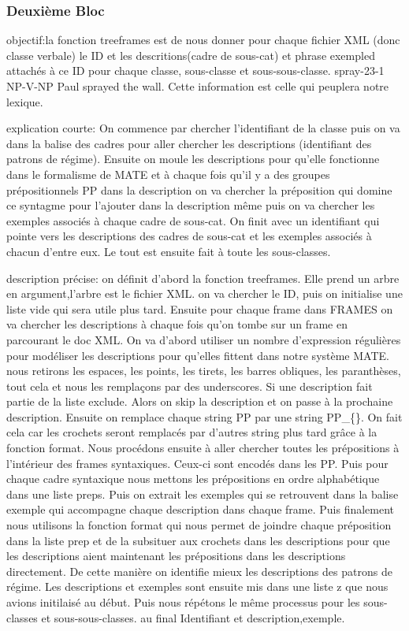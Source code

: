 \subsubsection{Deuxième Bloc}
objectif:la fonction treeframes est de nous donner pour chaque fichier XML (donc classe verbale) le ID et les descritions(cadre de sous-cat) et phrase exempled attachés à ce ID pour chaque classe, sous-classe et sous-sous-classe. spray-23-1 NP-V-NP Paul sprayed the wall. Cette information est celle qui peuplera notre lexique.

explication courte: On commence par chercher l'identifiant de la classe puis on va dans la balise des cadres pour aller chercher les descriptions (identifiant des patrons de régime). Ensuite on moule les descriptions pour qu'elle fonctionne dans le formalisme de MATE et à chaque fois qu'il y a des groupes prépositionnels PP dans la description on va chercher la préposition qui domine ce syntagme pour l'ajouter dans la description même  puis on va chercher les exemples associés à chaque cadre de sous-cat. On finit avec un identifiant qui pointe vers les descriptions des cadres de sous-cat et les exemples associés à chacun d'entre eux. Le tout est ensuite fait à toute les sous-classes.

description précise: on définit d'abord la fonction treeframes. Elle prend un arbre en argument,l'arbre est le fichier XML. on va chercher le ID, puis on initialise une liste vide qui sera utile plus tard. Ensuite pour chaque frame dans FRAMES on va chercher les descriptions à chaque fois qu'on tombe sur un frame en parcourant le doc XML. On va d'abord utiliser un nombre d'expression régulières pour modéliser les descriptions pour qu'elles fittent dans notre système MATE. nous retirons les espaces, les points, les tirets, les barres obliques, les paranthèses, tout cela et nous les remplaçons par des underscores. Si une description fait partie de la liste exclude. Alors on skip la description et on passe à la prochaine description. Ensuite on remplace chaque string PP par une string PP\_\{\}. On fait cela car les crochets seront remplacés par d'autres string plus tard grâce à la fonction format. Nous procédons ensuite à aller chercher toutes les prépositions à l'intérieur des frames syntaxiques. Ceux-ci sont encodés dans les PP. Puis pour chaque cadre syntaxique nous mettons les prépositions en ordre alphabétique dans une liste preps. Puis on extrait les exemples qui se retrouvent dans la balise exemple qui accompagne chaque description dans chaque frame. Puis finalement nous utilisons la fonction format qui nous permet de joindre chaque préposition dans la liste prep et de la subsituer aux crochets dans les descriptions pour que les descriptions aient maintenant les prépositions dans les descriptions directement. De cette manière on identifie mieux les descriptions des patrons de régime. Les descriptions et exemples sont ensuite mis dans une liste z que nous avions initilaisé au début. Puis nous répétons le même processus pour les sous-classes et sous-sous-classes. au final Identifiant et description,exemple. 

